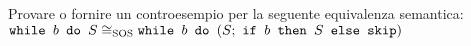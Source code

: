 {
  Provare o fornire un controesempio per la seguente equivalenza semantica: \\
  $\wbS{b}{S} \eqSOS{} \wbS{b}{(S;\ \ifABC{b}{S}{\skipForFriends})}$
}
{
}
